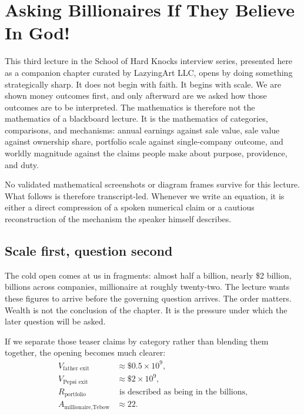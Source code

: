 \chapter{Asking Billionaires If They Believe In God!}

This third lecture in the School of Hard Knocks interview series, presented here as a companion chapter curated by LazyingArt LLC, opens by doing something strategically sharp. It does not begin with faith. It begins with scale. We are shown money outcomes first, and only afterward are we asked how those outcomes are to be interpreted. The mathematics is therefore not the mathematics of a blackboard lecture. It is the mathematics of categories, comparisons, and mechanisms: annual earnings against sale value, sale value against ownership share, portfolio scale against single-company outcome, and worldly magnitude against the claims people make about purpose, providence, and duty.

\begin{remark}
No validated mathematical screenshots or diagram frames survive for this lecture. What follows is therefore transcript-led. Whenever we write an equation, it is either a direct compression of a spoken numerical claim or a cautious reconstruction of the mechanism the speaker himself describes.
\end{remark}

\section{Scale first, question second}

The cold open comes at us in fragments: almost half a billion, nearly \$2 billion, billions across companies, millionaire at roughly twenty-two. The lecture wants these figures to arrive before the governing question arrives. The order matters. Wealth is not the conclusion of the chapter. It is the pressure under which the later question will be asked.

If we separate those teaser claims by category rather than blending them together, the opening becomes much clearer:
\begin{align}
V_{\text{father exit}} &\approx \$0.5\times 10^9,\\
V_{\text{Pepsi exit}} &\approx \$2\times 10^9,\\
R_{\text{portfolio}} &\text{ is described as being in the billions},\\
A_{\text{millionaire,Tebow}} &\approx 22.
\end{align}


